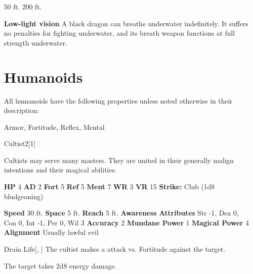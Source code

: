       
       50 ft.
     200 ft.
    \par\noindent\textbf{Low-light vision}
        A black dragon can breathe underwater indefinitely.
        It suffers no penalties for fighting underwater, and its breath weapon functions at full strength underwater.
  
  
        \newpage
        \section{Humanoids}

        All humanoids have the following properties unless noted otherwise in their description:
        
    
     Armor,
     Fortitude,
     Reflex,
     Mental
  
  
      
  \begin{monsection}{Cultist}{2}[1]
    \vspace{-1em}\vspace{-1em}
    \vspace{0em}

    
        Cultists may serve many masters.
        They are united in their generally malign intentions and their magical abilities.
      

    \begin{spellcontent}
      \begin{spelltargetinginfo}
        \pari \textbf{HP} 4 \monsep
          \textbf{AD} 2 \monsep
          \textbf{Fort} 5 \monsep
          \textbf{Ref} 5 \monsep
          \textbf{Ment} 7
        \pari \textbf{WR} 3 \monsep
        \textbf{VR} 15
        \pari \textbf{Strike:}
            Club  (1d8 bludgeoning)
      \end{spelltargetinginfo}
    \end{spellcontent}
    \begin{monsterfooter}
      \pari \textbf{Speed} 30 ft. \monsep
        \textbf{Space} 5 ft. \monsep
        \textbf{Reach} 5 ft.
      \pari \textbf{Awareness} 
      \pari \textbf{Attributes}
        Str -1, Dex 0,
        Con 0, Int -1,
        Per 0, Wil 3
      \pari \textbf{Accuracy} 2 \monsep
        \textbf{Mundane Power} 1 \monsep
      \textbf{Magical Power} 4
      \pari \textbf{Alignment} Usually lawful evil
    \end{monsterfooter}
  \end{monsection}
  \begin{freeability}{Drain Life}[, ]
       The cultist makes a  attack
        vs. Fortitude against the target.
    
    \hit The target takes 2d8 energy damage.
    \end{freeability}
  
